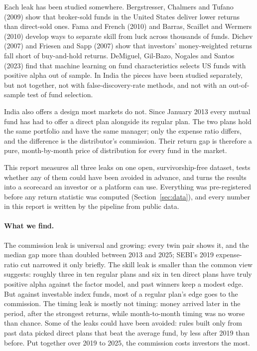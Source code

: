 \documentclass[11pt]{article}
\begin{document}
Each leak has been studied somewhere. Bergstresser, Chalmers and Tufano (2009) show that broker-sold funds in the United States deliver lower returns than direct-sold ones. Fama and French (2010) and Barras, Scaillet and Wermers (2010) develop ways to separate skill from luck across thousands of funds. Dichev (2007) and Friesen and Sapp (2007) show that investors' money-weighted returns fall short of buy-and-hold returns. DeMiguel, Gil-Bazo, Nogales and Santos (2023) find that machine learning on fund characteristics selects US funds with positive alpha out of sample. In India the pieces have been studied separately, but not together, not with false-discovery-rate methods, and not with an out-of-sample test of fund selection.

India also offers a design most markets do not. Since January 2013 every mutual fund has had to offer a direct plan alongside its regular plan. The two plans hold the same portfolio and have the same manager; only the expense ratio differs, and the difference is the distributor's commission. Their return gap is therefore a pure, month-by-month price of distribution for every fund in the market.

This report measures all three leaks on one open, survivorship-free dataset, tests whether any of them could have been avoided in advance, and turns the results into a scorecard an investor or a platform can use. Everything was pre-registered before any return statistic was computed (Section~\ref{sec:data}), and every number in this report is written by the pipeline from public data.

\paragraph{What we find.} The commission leak is universal and growing: every twin pair shows it, and the median gap more than doubled between 2013 and 2025; SEBI's 2019 expense-ratio cut narrowed it only briefly. The skill leak is smaller than the common view suggests: roughly three in ten regular plans and six in ten direct plans have truly positive alpha against the factor model, and past winners keep a modest edge. But against investable index funds, most of a regular plan's edge goes to the commission. The timing leak is mostly not timing: money arrived later in the period, after the strongest returns, while month-to-month timing was no worse than chance. Some of the leaks could have been avoided: rules built only from past data picked direct plans that beat the average fund, by less after 2019 than before. Put together over 2019 to 2025, the commission costs investors the most.
\end{document}
